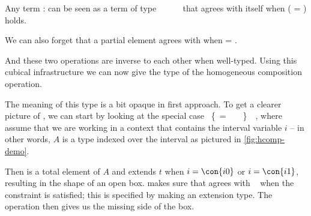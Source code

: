 Any term  :  can be seen as a term of type
~\func{[}~~~~\func{]} that agrees with
itself when ( = ) holds.
%

We can also forget that a partial element agrees with  when
 = .
%

And these two operations are inverse to each other when well-typed. Using
this cubical infrastructure we can now give the type of the
homogeneous composition operation.
%

The meaning of this type is a bit opaque in first approach.
% 
To get a clearer picture of , we can start by looking at the special
case
~\{~=~~~~\}~~,
where assume that we are working in a context that contains the interval 
variable \( i \) -- in other words, \( A \) is a type indexed over the interval 
 as pictured in \cref{fig:hcomp-demo}.
 
Then  is a total element of \( A \) and  extends \( t \)
when \( i = \con{i0} \) or \( i = \con{i1} \), resulting in the shape of
an open box.
% 
\CubicalAgda makes sure that  agrees with ~ when the
constraint is satisfied; this is specified by making  an extension type. 
% 
The  operation then gives us the missing side of the box.

